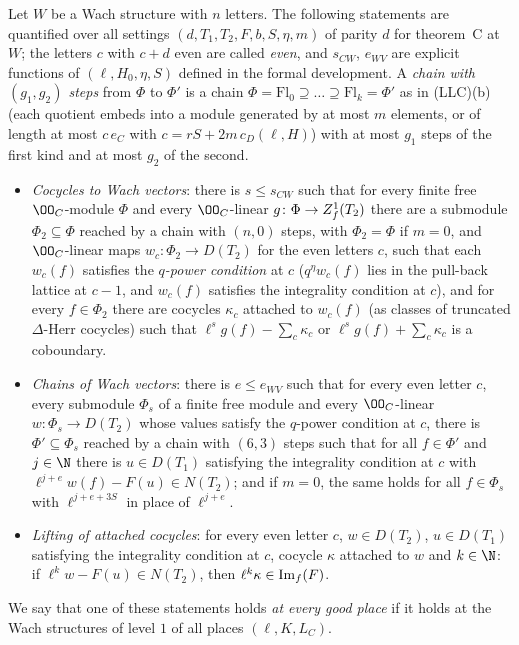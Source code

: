 \begin{definition}\label{pf:linkN-adm:def-three}
Let $W$ be a Wach structure with $n$ letters. The following statements are quantified over all settings
$(d,T_1,T_2,F,b,S,\eta,m)$ of parity $d$ for theorem~C at $W$; the letters $c$ with $c+d$ even are called \emph{even}, and
$s_{CW}$, $e_{WV}$ are explicit functions of $(\ell,H_0,\eta,S)$ defined in the formal development. A \emph{chain with
$(g_1,g_2)$ steps} from $\Phi$ to $\Phi'$ is a chain $\Phi=\mathrm{Fl}_0\supseteq\dots\supseteq\mathrm{Fl}_k=\Phi'$ as in
(LLC)(b) (each quotient embeds into a module generated by at most $m$ elements, or of length at most $c\,e_C$ with
$c=rS+2m\,c_D(\ell,H)$) with at most $g_1$ steps of the first kind and at most $g_2$ of the second.
\begin{itemize}
\item[(CW)] \emph{Cocycles to Wach vectors}: there is $s\le s_{CW}$ such that for every finite free $\OO_C$-module $\Phi$ and
  every $\OO_C$-linear $g\colon\Phi\to Z^1_{f}(T_2)$ there are a submodule $\Phi_2\subseteq\Phi$ reached by a chain with
  $(n,0)$ steps, with $\Phi_2=\Phi$ if $m=0$, and $\OO_C$-linear maps $w_c\colon\Phi_2\to D(T_2)$ for the even letters $c$,
  such that each $w_c(f)$ satisfies the \emph{$q$-power condition} at $c$ ($q^\eta w_c(f)$ lies in the pull-back lattice at
  $c-1$, and $w_c(f)$ satisfies the integrality condition at $c$), and for every $f\in\Phi_2$ there are cocycles
  $\kappa_c$ attached to $w_c(f)$ (as classes of truncated $\Delta$-Herr cocycles) such that $\ell^sg(f)-\sum_c\kappa_c$ or
  $\ell^sg(f)+\sum_c\kappa_c$ is a coboundary.
\item[(WV)] \emph{Chains of Wach vectors}: there is $e\le e_{WV}$ such that for every even letter $c$, every submodule
  $\Phi_s$ of a finite free module and every $\OO_C$-linear $w\colon\Phi_s\to D(T_2)$ whose values satisfy the $q$-power
  condition at $c$, there is $\Phi'\subseteq\Phi_s$ reached by a chain with $(6,3)$ steps such that for all $f\in\Phi'$ and
  $j\in\N$ there is $u\in D(T_1)$ satisfying the integrality condition at $c$ with $\ell^{j+e}w(f)-F(u)\in N(T_2)$; and if
  $m=0$, the same holds for all $f\in\Phi_s$ with $\ell^{j+e+3S}$ in place of $\ell^{j+e}$.
\item[(RL)] \emph{Lifting of attached cocycles}: for every even letter $c$, $w\in D(T_2)$, $u\in D(T_1)$ satisfying the
  integrality condition at $c$, cocycle $\kappa$ attached to $w$ and $k\in\N$: if $\ell^kw-F(u)\in N(T_2)$, then
  $\ell^k\kappa\in\operatorname{Im}_f(F)$.
\end{itemize}
We say that one of these statements holds \emph{at every good place} if it holds at the Wach structures of level $1$ of all
places $(\ell,K,L_C)$.
\end{definition}

